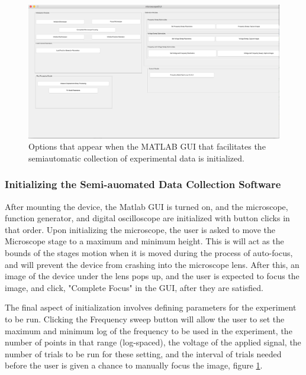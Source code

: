 \begin{figure}[htpb]
    \begin{center}
    \includegraphics[width=0.9\linewidth]{Chapter2/Figs/Raster/guioptions.png}
    \caption{Options that appear when the MATLAB GUI that facilitates the semiautomatic collection of experimental data is initialized.}\label{gui_options}
    \end{center}
\end{figure}
\subsubsection{Initializing the Semi-auomated Data Collection Software}
After mounting the device, the Matlab GUI is turned on, and the microscope, function generator, and digital oscilloscope are initialized with button clicks in that order. Upon initializing the microscope, the user is asked to move the Microscope stage to a maximum and minimum height. This is will act as the bounds of the stages motion when it is moved during the process of auto-focus, and will prevent the device from crashing into the microscope lens. After this, an image of the device under the lens pops up, and the user is expected to focus the image, and click, "Complete Focus" in the GUI, after they are satisfied. 



The final aspect of initialization involves defining parameters for the experiment to be run. Clicking the Frequency sweep button will allow the user to set the maximum and minimum log of the frequency to be used in the experiment, the number of points in that range (log-spaced), the voltage of the applied signal, the number of trials to be run for these setting, and the interval of trials needed before the user is given a chance to manually focus the image, figure \ref{gui_options}. 



